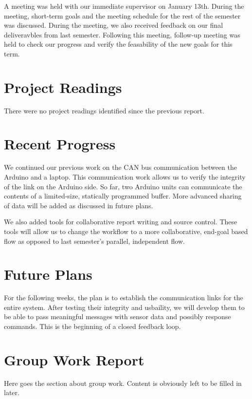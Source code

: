 \documentclass[12pt]{article}
\begin{document}
A meeting was held with our immediate supervisor on January 13th. During the
meeting, short-term goals and the meeting schedule for the rest of the semester
was discussed. During the meeting, we also received feedback on our final 
deliveravbles from last semester. Following this meeting, follow-up meeting was
held to check our progress and verify the feasability of the new goals for 
this term. 

\section*{Project Readings}
There were no project readings identified since the previous report.

\section*{Recent Progress}
We continued our previous work on the CAN bus communication between the Arduino
and a laptop. This communication work allows us to verify the integrity of the 
link on the Arduino side. So far, two Arduino units can communicate the 
contents of a limited-size, statically programmed buffer. More advanced 
sharing of data will be added as discussed in future plans.\newline

We also added tools for collaborative report writing and source control. These
tools will allow us to change the workflow to a more collaborative, end-goal 
based flow as opposed to last semester's parallel, independent flow. 

\section*{Future Plans}
For the following weeks, the plan is to establish the communication links for 
the entire system. After testing their integrity and usbaility, we will 
develop them to be able to pass meaningful messages with sensor data and 
possibly response commands. This is the beginning of a closed feedback loop.

\section*{Group Work Report}
Here goes the section about group work. Content is obviously left to be filled
in later.
\end{document}
